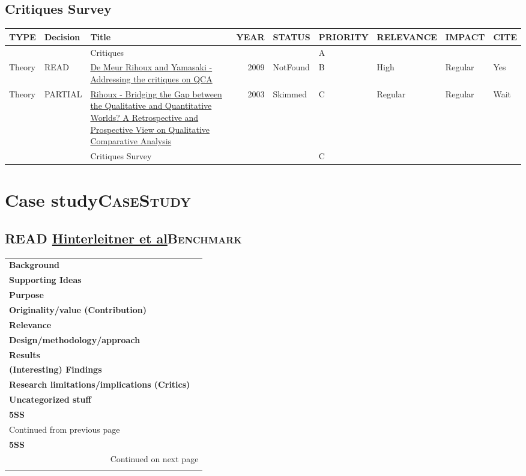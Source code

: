 \documentclass[11pt]{article}
\begin{document}
\subsection*{Critiques Survey}
\label{sec:org155b463}
\begin{center}
\begin{tabular}{lllrlllll}
TYPE & Decision & Title & YEAR & STATUS & PRIORITY & RELEVANCE & IMPACT & CITE\\
\hline
 &  & Critiques &  &  & A &  &  & \\
Theory & READ & \href{https://dx.doi.org/10.4135/9781452226569.n7}{De Meur Rihoux and Yamasaki - Addressing the critiques on QCA} & 2009 & NotFound & B & High & Regular & Yes\\
Theory & PARTIAL & \href{https://doi.org/10.1177\%2F1525822X03257690}{Rihoux - Bridging the Gap between the Qualitative and Quantitative Worlds? A Retrospective and Prospective View on Qualitative Comparative Analysis} & 2003 & Skimmed & C & Regular & Regular & Wait\\
 &  & Critiques Survey &  &  & C &  &  & \\
\end{tabular}
\end{center}



\section*{Case study\hfill{}\textsc{CaseStudy}}
\label{sec:orgb407b19}
\subsection*{{\bfseries\sffamily READ} \href{http://dx.doi.org/10.1111/1475-6765.12142}{Hinterleitner et al}\hfill{}\textsc{Benchmark}}
\label{sec:orgf696606}
\begin{longtable}{l|p{}}
\hline
\hline
\textbf{Background} & \\
\textbf{Supporting Ideas} & \\
\textbf{Purpose} & \\
\textbf{Originality/value (Contribution)} & \\
\textbf{Relevance} & \\
\textbf{Design/methodology/approach} & \\
\textbf{Results} & \\
\textbf{(Interesting) Findings} & \\
\textbf{Research limitations/implications (Critics)} & \\
\textbf{Uncategorized stuff} & \\
\textbf{5SS} & \\
\hline
\endfirsthead
\multicolumn{2}{l}{Continued from previous page} \\

\textbf{5SS} &  \\

\hline
\endhead
\hline\multicolumn{2}{r}{Continued on next page} \\
\endfoot
\endlastfoot
\hline
\hline
\end{longtable}
\end{document}
